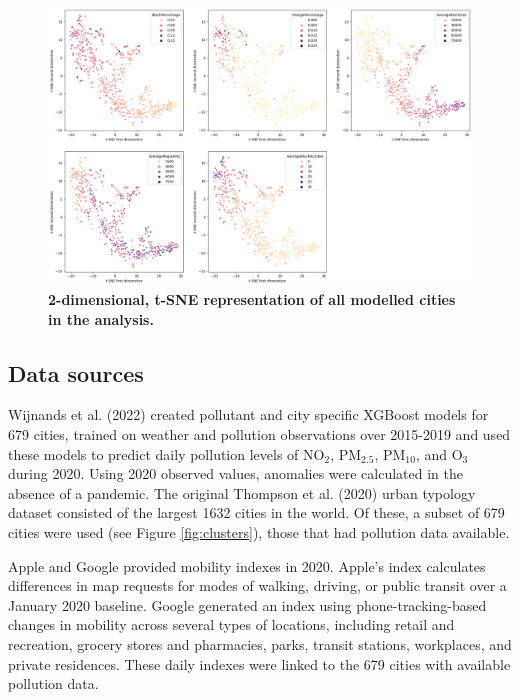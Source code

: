 \documentclass[preprint,12pt]{elsarticle}
\begin{document}
\begin{figure}
\centering
\includegraphics[trim={ 0 0 0 0 },clip,scale=0.35]{Images/City Types Dimensions.png}
\caption{\bf 2-dimensional, t-SNE representation of all modelled cities in the analysis.}
 \label{fig:Dimensions}
\end{figure}




\subsection*{Data sources}


Wijnands et al. (2022) \cite{Wijnands2022} created pollutant and city specific XGBoost models for 679 cities, trained on weather and pollution observations over 2015-2019 and used these models to predict daily pollution levels of NO$_{2}$, PM$_{2.5}$, PM$_{10}$, and O$_{3}$ during 2020. Using 2020 observed values, anomalies were calculated in the absence of a pandemic. The original Thompson et al. (2020)\cite{Thompson2020} urban typology dataset consisted of the largest 1632 cities in the world. Of these, a subset of 679 cities were used (see Figure \ref{fig:clusters}), those that had pollution data available.

Apple \cite{Apple2020} and Google \cite{Google2020} provided mobility indexes in 2020. Apple's index calculates differences in map requests for modes of walking, driving, or public transit over a January 2020 baseline. Google generated an index using phone-tracking-based changes in mobility across several types of locations, including retail and recreation, grocery stores and pharmacies, parks, transit stations, workplaces, and private residences. These daily indexes were linked to the 679 cities with available pollution data.
\end{document}
